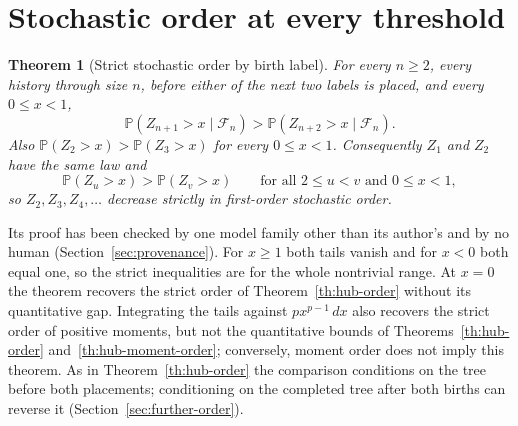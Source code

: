 \documentclass[11pt]{article}
\newtheorem{theorem}{Theorem}
\newcommand{\resulttag}{?}
\newcommand{\tagnext}[1]{\renewcommand{\resulttag}{#1}}
\newcommand{\sectag}[1]{\renewcommand{\thesection}{#1}\renewcommand{\theHsection}{#1}}
\theoremstyle{remark}
\numberwithin{equation}{section}
\newcommand{\Prob}{\mathbb P}
\begin{document}
\sectag{ORD}
\section{Stochastic order at every threshold}\label{sec:ord}\label{app:stoch-order}
\tagnext{ORD}
\begin{theorem}[Strict stochastic order by birth label]\label{th:stoch-order}
For every $n\ge2$, every history through size $n$, before either of the next two labels is placed, and every $0\le x<1$,
\[
 \Prob(Z_{n+1}>x\mid\mathcal F_n)>\Prob(Z_{n+2}>x\mid\mathcal F_n).
\]
Also $\Prob(Z_2>x)>\Prob(Z_3>x)$ for every $0\le x<1$. Consequently $Z_1$ and $Z_2$ have the same law and
\[
 \Prob(Z_u>x)>\Prob(Z_v>x)\qquad\text{for all }2\le u<v\text{ and }0\le x<1,
\]
so $Z_2,Z_3,Z_4,\ldots$ decrease strictly in first-order stochastic order.
\end{theorem}
Its proof has been checked by one model family other than its author's and by no human (Section~\ref{sec:provenance}).
For $x\ge1$ both tails vanish and for $x<0$ both equal one, so the strict inequalities are for the whole nontrivial range. At $x=0$ the theorem recovers the strict order of Theorem~\ref{th:hub-order} without its quantitative gap. Integrating the tails against $p x^{p-1}\,dx$ also recovers the strict order of positive moments, but not the quantitative bounds of Theorems~\ref{th:hub-order} and~\ref{th:hub-moment-order}; conversely, moment order does not imply this theorem. As in Theorem~\ref{th:hub-order} the comparison conditions on the tree before both placements; conditioning on the completed tree after both births can reverse it (Section~\ref{sec:further-order}).
\end{document}
